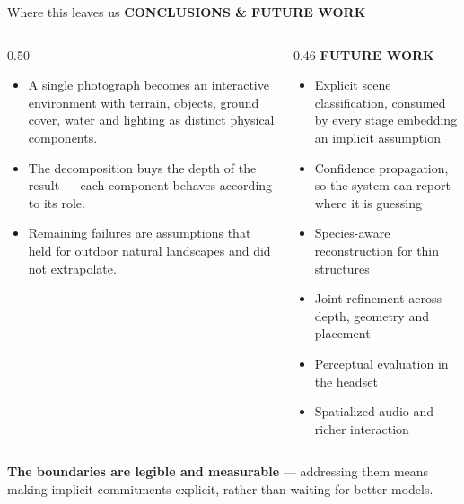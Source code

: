 \documentclass[aspectratio=169,11pt]{beamer}
\newcommand{\kicker}[1]{{\color{accent}\bfseries\scriptsize\MakeUppercase{#1}}\par\vspace{0.2em}}
\newcommand{\lead}[1]{{\color{ink}\bfseries #1}}
\begin{document}
\begin{frame}{Where this leaves us}
  \kicker{conclusions \& future work}
  \begin{columns}[T]
    \begin{column}{0.50\textwidth}
      \small
      \begin{itemize}\setlength\itemsep{0.6em}
        \item A single photograph becomes an interactive environment with terrain,
              objects, ground cover, water and lighting as distinct physical
              components.
        \item The decomposition buys the depth of the result --- each component
              behaves according to its role.
        \item Remaining failures are assumptions that held for outdoor natural
              landscapes and did not extrapolate.
      \end{itemize}
    \end{column}
    \begin{column}{0.46\textwidth}
      {\color{accent}\bfseries\scriptsize FUTURE WORK}\par\vspace{0.4em}
      \scriptsize
      \begin{itemize}\setlength\itemsep{0.35em}
        \item Explicit scene classification, consumed by every stage embedding an
              implicit assumption
        \item Confidence propagation, so the system can report where it is guessing
        \item Species-aware reconstruction for thin structures
        \item Joint refinement across depth, geometry and placement
        \item Perceptual evaluation in the headset
        \item Spatialized audio and richer interaction
      \end{itemize}
    \end{column}
  \end{columns}
  \vspace{1.0em}
  \par\centering\small
  \lead{The boundaries are legible and measurable} --- addressing them means making
  implicit commitments explicit, rather than waiting for better models.
\end{frame}
\end{document}
